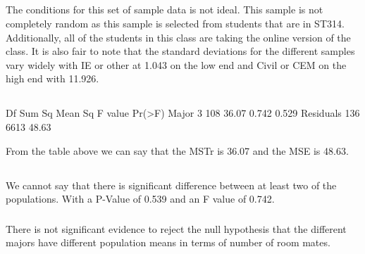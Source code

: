 \documentclass[letterpaper, onecolumn,10pt]{IEEEtran}
\begin{document}
            \subsection{}
            The conditions for this set of sample data is not ideal. This sample is not completely random as this sample is selected from students that are in ST314. Additionally, all of the students in this class are taking the online version of the class. It is also fair to note that the standard deviations for the different samples vary widely with IE or other at 1.043 on the low end and Civil or CEM on the high end with 11.926.\\
            
            \subsection{}
            \begin{lslisting}[sh]
            Df Sum Sq Mean Sq F value Pr(>F)
Major         3    108   36.07   0.742  0.529
Residuals   136   6613   48.63   
            \end{lslisting}
            
            From the table above we can say that the MSTr is 36.07 and the MSE is 48.63.\\ 
            
            \subsection{}
                \subsubsection{}
                We cannot say that there is significant difference between at least two of the populations. With a P-Value of 0.539 and an F value of 0.742.\\
                
                \subsubsection{}
                There is not significant evidence to reject the null hypothesis that the different majors have different population means in terms of number of room mates.\\
            \subsection{}
\end{document}
